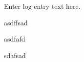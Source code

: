 \documentclass[10pt]{article}
\begin{document}
Enter log entry text here.

asdffsad

asdfafd


sdafsad
\end{document}
